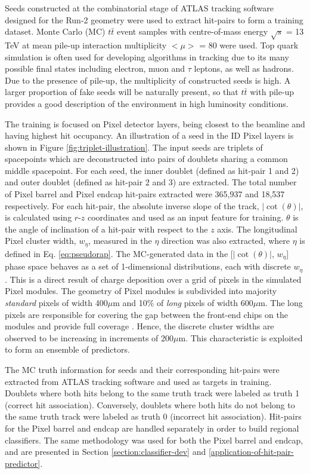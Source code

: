 Seeds constructed at the combinatorial stage of ATLAS tracking software designed for the Run-2 geometry were used to extract hit-pairs to form a training dataset. Monte Carlo (MC) $t\bar{t}$ event samples with centre-of-mass energy $\sqrt{s}$ = 13 TeV at mean pile-up interaction multiplicity $< \mu >$ = 80 were used. Top quark simulation is often used for developing algorithms in tracking due to its many possible final states including electron, muon and $\tau$ leptons, as well as hadrons. Due to the presence of pile-up, the multiplicity of constructed seeds is high. A larger proportion of fake seeds will be naturally present, so that $t\bar{t}$ with pile-up provides a good description of the environment in high luminosity conditions.

The training is focused on Pixel detector layers, being closest to the beamline and having highest hit occupancy. An illustration of a seed in the ID Pixel layers is shown in Figure \ref{fig:triplet-illustration}. The input seeds are triplets of spacepoints which are deconstructed into pairs of doublets sharing a common middle spacepoint. For each seed, the inner doublet (defined as hit-pair 1 and 2) and outer doublet (defined as hit-pair 2 and 3) are extracted. The total number of Pixel barrel and Pixel endcap hit-pairs extracted were 365,937 and 18,537 respectively. For each hit-pair, the absolute inverse slope of the track, $|\cot(\theta)|$, is calculated using $r$-$z$ coordinates and used as an input feature for training. $\theta$ is the angle of inclination of a hit-pair with respect to the $z$ axis. The longitudinal Pixel cluster width, $w_{\eta}$, measured in the $\eta$ direction was also extracted, where $\eta$ is defined in Eq. \ref{eq:pseudorap}. The MC-generated data in the [$|\cot(\theta)|$, $w_{\eta}$] phase space behaves as a set of 1-dimensional distributions, each with discrete $w_{\eta}$. This is a direct result of charge deposition over a grid of pixels in the simulated Pixel modules. The geometry of Pixel modules is subdivided into majority \textit{standard} pixels of width 400$\mu$m and 10\% of \textit{long} pixels of width 600$\mu$m. The long pixels are responsible for covering the gap between the front-end chips on the modules and provide full coverage \cite{pixel-module-dimensions}. Hence, the discrete cluster widths are observed to be increasing in increments of 200$\mu$m. This characteristic is exploited to form an ensemble of predictors. 

The MC truth information for seeds and their corresponding hit-pairs were extracted from ATLAS tracking software and used as targets in training. Doublets where both hits belong to the same truth track were labeled as truth 1 (correct hit association). Conversely, doublets where both hits do not belong to the same truth track were labeled as truth 0 (incorrect hit association). Hit-pairs for the Pixel barrel and endcap are handled separately in order to build regional classifiers. The same methodology was used for both the Pixel barrel and endcap, and are presented in Section \ref{section:classifier-dev} and \ref{application-of-hit-pair-predictor}.

